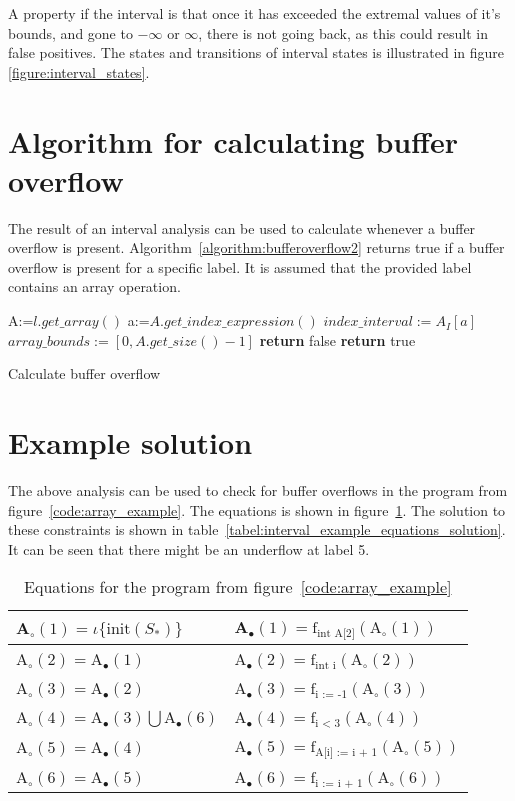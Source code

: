 A property if the interval is that once it has exceeded the extremal values of it's bounds, and gone to $-\infty$ or $\infty$, there is not going back, as this could result in false positives. The states and transitions of interval states is illustrated in figure \ref{figure:interval_states}.

\section{Algorithm for calculating buffer overflow}
The result of an interval analysis can be used to calculate whenever a buffer overflow is present. Algorithm~\ref{algorithm:bufferoverflow2} returns true if a buffer overflow is present for a specific label. It is assumed that the provided label contains an array operation.
\begin{algorithm}
 \begin{algorithmic}[1]
\State A:=$l.get\_array()$
\State a:=$A.get\_index\_expression()$
\State $index\_interval:=A_I[a]$
\State $array\_bounds:=[0,A.get\_size()-1]$
\State \textbf{return} false
\Else
\State \textbf{return} true
\EndIf 
 \EndProcedure
 \end{algorithmic}
 \caption{Calculate buffer overflow}
 \label{algorithm:bufferoverflow2}
\end{algorithm}

\section{Example solution}
The above analysis can be used to check for buffer overflows in the program from figure~\ref{code:array_example}. The equations is shown in figure~\ref{table:interval_equations}. The solution to these constraints is shown in table~\ref{tabel:interval_example_equations_solution}. It can be seen that there might be an underflow at label 5.
\begin{table}[h]
\begin{tabular}{| l | l |}
\hline
A$_\circ (1) = \iota \{\text{init}(S_*) \} $ & A$_\bullet(1) = \text{f}_{\text{int A[2]}} (\text{A}_\circ (1))$ \\
\hline
A$_\circ (2) =$A$_\bullet(1) $ & A$_\bullet(2) = \text{f}_{\text{int i}} (\text{A}_\circ (2))$ \\
\hline
A$_\circ (3) = $A$_\bullet(2)$ & A$_\bullet(3) = \text{f}_{\text{i := -1}} (\text{A}_\circ (3))$  \\
\hline
A$_\circ (4) = $A$_\bullet(3) \bigcup $A$_\bullet(6) $ & A$_\bullet(4) = \text{f}_{\text{i < 3}} (\text{A}_\circ (4))$ \\
\hline
A$_\circ (5) = $A$_\bullet(4)$ & A$_\bullet(5) = \text{f}_{\text{A[i] := i + 1}} (\text{A}_\circ (5))$ \\
\hline
A$_\circ (6) = $A$_\bullet(5)$ & A$_\bullet(6) = \text{f}_{\text{i := i + 1}} (\text{A}_\circ (6))$ \\

\hline
\end{tabular}
\centering
\caption{Equations for the program from figure~\ref{code:array_example}}
\label{table:interval_equations}
\end{table}

